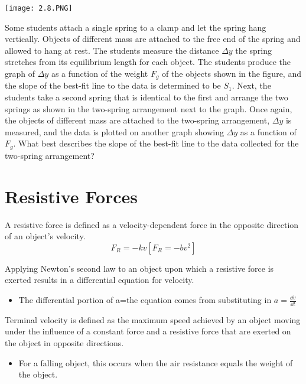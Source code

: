\documentclass[../mech.tex]{subfiles}
\begin{document}
\ex \begin{center}
    \texttt{[image: 2.8.PNG]}
\end{center}
Some students attach a single spring to a clamp and let the spring hang vertically. Objects of different mass are attached to the free end of the spring and allowed to hang at rest. The students measure the 
distance $\Delta y$ the spring stretches from its equilibrium length for each object. The students produce the graph of $\Delta y$ as a function of the weight $F_g$ of the objects shown in the figure, and the slope of the best-fit line to the data is determined to be 
$S_1$. Next, the students take a second spring that is identical to the first and arrange the two springs as shown in the two-spring arrangement next to the graph. Once again, the objects of different mass are attached to the two-spring arrangement,
$\Delta y$ is measured, and the data is plotted on another graph showing $\Delta y$ as a function of $F_g$. What best describes the slope of the best-fit line to the data collected for the two-spring arrangement?

\section{Resistive Forces}
A resistive force is defined as a velocity-dependent force in the opposite direction of an object's velocity.
\[ F_R=-kv [F_R=-bv^2] \]

Applying Newton's second law to an object upon which a resistive force is exerted results in a differential equation for velocity.
\begin{itemize}
    \item The differential portion of a=the equation comes from substituting in $a=\frac{\dd v}{\dd t}$
\end{itemize}

Terminal velocity is defined as the maximum speed achieved by an object moving under the influence of a constant force and a resistive force that are exerted on the object in opposite directions.
\begin{itemize}
    \item For a falling object, this occurs when the air resistance equals the weight of the object.
\end{itemize}
\end{document}
